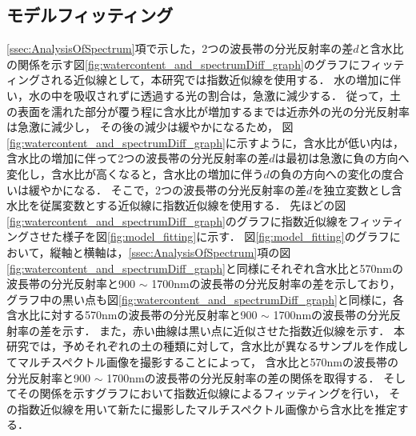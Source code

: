 \clearpage

\subsection{モデルフィッティング}
\label{ssec:ModelFitting}

\ref{ssec:AnalysisOfSpectrum}項で示した，2つの波長帯の分光反射率の差$d$と含水比の関係を示す図\ref{fig:watercontent_and_spectrumDiff_graph}のグラフにフィッティングされる近似線として，本研究では指数近似線を使用する．
水の増加に伴い，水の中を吸収されずに透過する光の割合は，急激に減少する．
従って，土の表面を濡れた部分が覆う程に含水比が増加するまでは近赤外の光の分光反射率は急激に減少し，
その後の減少は緩やかになるため，
図\ref{fig:watercontent_and_spectrumDiff_graph}に示すように，含水比が低い内は，含水比の増加に伴って2つの波長帯の分光反射率の差$d$は最初は急激に負の方向へ変化し，含水比が高くなると，含水比の増加に伴う$d$の負の方向への変化の度合いは緩やかになる．
そこで，2つの波長帯の分光反射率の差$d$を独立変数とし含水比を従属変数とする近似線に指数近似線を使用する．
先ほどの図\ref{fig:watercontent_and_spectrumDiff_graph}のグラフに指数近似線をフィッティングさせた様子を図\ref{fig:model_fitting}に示す．
図\ref{fig:model_fitting}のグラフにおいて，縦軸と横軸は，\ref{ssec:AnalysisOfSpectrum}項の図\ref{fig:watercontent_and_spectrumDiff_graph}と同様にそれぞれ含水比と570nmの波長帯の分光反射率と900 $\sim$ 1700nmの波長帯の分光反射率の差を示しており，グラフ中の黒い点も図\ref{fig:watercontent_and_spectrumDiff_graph}と同様に，各含水比に対する570nmの波長帯の分光反射率と900 $\sim$ 1700nmの波長帯の分光反射率の差を示す．
また，赤い曲線は黒い点に近似させた指数近似線を示す．
本研究では，予めそれぞれの土の種類に対して，含水比が異なるサンプルを作成してマルチスペクトル画像を撮影することによって，
含水比と570nmの波長帯の分光反射率と900 $\sim$ 1700nmの波長帯の分光反射率の差の関係を取得する．
そしてその関係を示すグラフにおいて指数近似線によるフィッティングを行い，
その指数近似線を用いて新たに撮影したマルチスペクトル画像から含水比を推定する．


